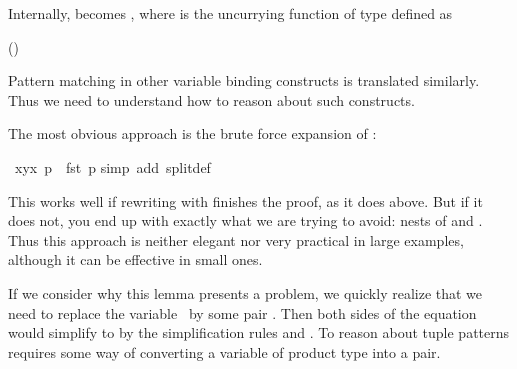 \begin{isabellebody}
\begin{isamarkuptext}
Internally,  becomes , where
 is the uncurrying function of type  defined as
\begin{center}
\hfill()
\end{center}
Pattern matching in
other variable binding constructs is translated similarly. Thus we need to
understand how to reason about such constructs.%
\end{isamarkuptext}%
\isamarkuptrue%
%
\isamarkuptrue%
%
\begin{isamarkuptext}%
The most obvious approach is the brute force expansion of :%
\end{isamarkuptext}%
\isamarkuptrue%
\ {\isachardoublequote}{\isacharparenleft}{\isasymlambda}{\isacharparenleft}x{\isacharcomma}y{\isacharparenright}{\isachardot}x{\isacharparenright}\ p\ {\isacharequal}\ fst\ p{\isachardoublequote}\isanewline
\isamarkupfalse%
simp\ add{\isacharcolon}\ split{\isacharunderscore}def{\isacharparenright}\isamarkupfalse%
%
\begin{isamarkuptext}%
This works well if rewriting with  finishes the
proof, as it does above.  But if it does not, you end up with exactly what
we are trying to avoid: nests of  and . Thus this
approach is neither elegant nor very practical in large examples, although it
can be effective in small ones.

If we consider why this lemma presents a problem, 
we quickly realize that we need to replace the variable~ by some pair .  Then both sides of the
equation would simplify to  by the simplification rules
 and .  
To reason about tuple patterns requires some way of
converting a variable of product type into a pair.


\end{isamarkuptext}
\end{isabellebody}
